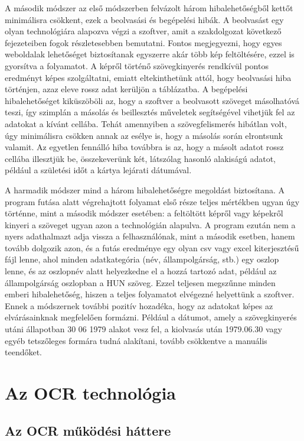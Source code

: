 \documentclass[12pt]{report}
\begin{document}
A második módszer az első módszerben felvázolt három hibalehetőségből kettőt minimálisra csökkent, ezek a beolvasási és begépelési hibák. A beolvasást egy olyan technológiára alapozva végzi a szoftver, amit a szakdolgozat következő fejezeteiben fogok részletesebben bemutatni. Fontos megjegyezni, hogy egyes weboldalak lehetőséget biztosítanak egyszerre akár több kép feltöltésére, ezzel is gyorsítva a folyamatot. A képről történő szövegkinyerés rendkívül pontos eredményt képes szolgáltatni, emiatt eltekinthetünk attól, hogy beolvasási hiba történjen, azaz eleve rossz adat kerüljön a táblázatba. A begépelési hibalehetőséget kiküszöböli az, hogy a szoftver a beolvasott szöveget másolhatóvá teszi, így szimplán a másolás és beillesztés műveletek segítségével vihetjük fel az adatokat a kívánt cellába. Tehát amennyiben a szövegfelismerés hibátlan volt, úgy minimálisra csökken annak az esélye is, hogy a másolás során elrontsunk valamit. Az egyetlen fennálló hiba továbbra is az, hogy a másolt adatot rossz cellába illesztjük be, összekeverünk két, látszólag hasonló alakiságú adatot, például a születési időt a kártya lejárati dátumával.

A harmadik módszer mind a három hibalehetőségre megoldást biztosítana. A program futása alatt végrehajtott folyamat első része teljes mértékben ugyan úgy történne, mint a második módszer esetében: a feltöltött képről vagy képekről kinyeri a szöveget ugyan azon a technológián alapulva. A program ezután nem a nyers adathalmazt adja vissza a felhasználónak, mint a második esetben, hanem tovább dolgozik azon, és a futás eredménye egy olyan csv vagy excel kiterjesztésű fájl lenne, ahol minden adatkategória (név, állampolgárság, stb.) egy oszlop lenne, és az oszlopnév alatt helyezkedne el a hozzá tartozó adat, például az állampolgárság oszlopban a HUN szöveg. Ezzel teljesen megszűnne minden emberi hibalehetőség, hiszen a teljes folyamatot elvégezné helyettünk a szoftver. Ennek a módszernek további pozitív hozadéka, hogy az adatokat képes az elvárásainknak megfelelően formázni. Például a dátumot, amely a szövegkinyerés utáni állapotban 30 06 1979 alakot vesz fel, a kiolvasás után 1979.06.30 vagy egyéb tetszőleges formára tudná alakítani, tovább csökkentve a manuális teendőket.

\chapter{Az OCR technológia}
\section{Az OCR működési háttere}
\end{document}
